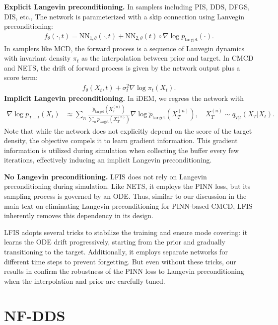 \documentclass{article} %
\def\ptarget{p_\text{target}}
\def\ptilde{\tilde{p}_\text{target}}
\begin{document}
\textbf{Explicit Langevin preconditioning. }
In samplers including PIS, DDS, DFGS, DIS, etc., 
The network is parameterized with a skip connection using Lanvegin preconditioning:
\begin{align}
  f_\theta(\cdot, t) = \text{NN}_{1,\theta}(\cdot, t) + \text{NN}_{2, \theta}(t) \circ  \nabla\log \ptarget(\cdot).
\end{align}
In samplers like MCD, the forward process is a sequence of Lanvegin dynamics with invariant density $\pi_t$ as the interpolation between prior and target.
In CMCD and NETS, the drift of forward process is given by the network output plus a score term: 
\begin{align}
    f_\theta(X_t, t) +\sigma_t^2  \nabla \log \pi_t (X_t).
\end{align}
\textbf{Implicit Langevin preconditioning. } In iDEM, we regress the network with 
\begin{align}
     \nabla \log p_{T-t} (X_t) 
            &\approx\sum_{n} \frac{\ptilde (X_T^{(n)})}{ \sum_{n}  \ptilde (X_T^{(n)})}\nabla \log \ptilde (X_T^{(n)}), \quad X_T^{(n)}\sim  q_{T|t}(X_T | X_t).
\end{align}
Note that while the network does not explicitly depend on the score of the target density, the objective compels it to learn gradient information.
This gradient information is utilized during simulation when collecting the buffer every few iterations, effectively inducing an implicit Langevin preconditioning.

\textbf{No Langevin preconditioning. } 
LFIS does not rely on Langevin preconditioning during simulation.
Like NETS, it employs the PINN loss, but its sampling process is governed by an ODE.
Thus, similar to our discussion in the main text on eliminating Langevin preconditioning for PINN-based CMCD, LFIS inherently removes this dependency in its design.

LFIS adopts several tricks to stabilize the training and ensure mode covering:
it learns the ODE drift progressively, starting from the prior and gradually transitioning to the target.
Additionally, it employs separate networks for different time steps to prevent forgetting.
But even without these tricks,  our results in  confirm the robustness of the PINN loss to Langevin preconditioning when the interpolation and prior are carefully tuned.





\section{NF-DDS}\label{appendix:nf-dds}
\end{document}

